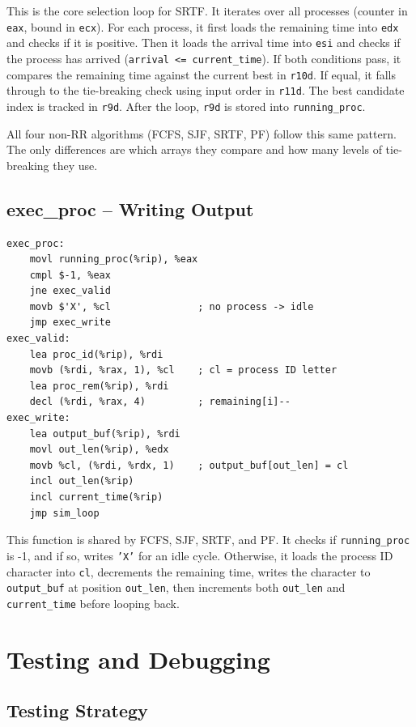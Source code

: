 \documentclass[a4paper,12pt]{article}
\begin{document}
This is the core selection loop for SRTF. It iterates over all processes (counter in \texttt{eax}, bound in \texttt{ecx}). For each process, it first loads the remaining time into \texttt{edx} and checks if it is positive. Then it loads the arrival time into \texttt{esi} and checks if the process has arrived (\texttt{arrival <= current\_time}). If both conditions pass, it compares the remaining time against the current best in \texttt{r10d}. If equal, it falls through to the tie-breaking check using input order in \texttt{r11d}. The best candidate index is tracked in \texttt{r9d}. After the loop, \texttt{r9d} is stored into \texttt{running\_proc}.

All four non-RR algorithms (FCFS, SJF, SRTF, PF) follow this same pattern. The only differences are which arrays they compare and how many levels of tie-breaking they use.

\subsection{exec\_proc -- Writing Output}

\begin{lstlisting}[style=AsmStyle]
exec_proc:
    movl running_proc(%rip), %eax
    cmpl $-1, %eax
    jne exec_valid
    movb $'X', %cl               ; no process -> idle
    jmp exec_write
exec_valid:
    lea proc_id(%rip), %rdi
    movb (%rdi, %rax, 1), %cl    ; cl = process ID letter
    lea proc_rem(%rip), %rdi
    decl (%rdi, %rax, 4)         ; remaining[i]--
exec_write:
    lea output_buf(%rip), %rdi
    movl out_len(%rip), %edx
    movb %cl, (%rdi, %rdx, 1)    ; output_buf[out_len] = cl
    incl out_len(%rip)
    incl current_time(%rip)
    jmp sim_loop
\end{lstlisting}

This function is shared by FCFS, SJF, SRTF, and PF. It checks if \texttt{running\_proc} is -1, and if so, writes \texttt{'X'} for an idle cycle. Otherwise, it loads the process ID character into \texttt{cl}, decrements the remaining time, writes the character to \texttt{output\_buf} at position \texttt{out\_len}, then increments both \texttt{out\_len} and \texttt{current\_time} before looping back.

\section{Testing and Debugging}

\subsection{Testing Strategy}
\end{document}
